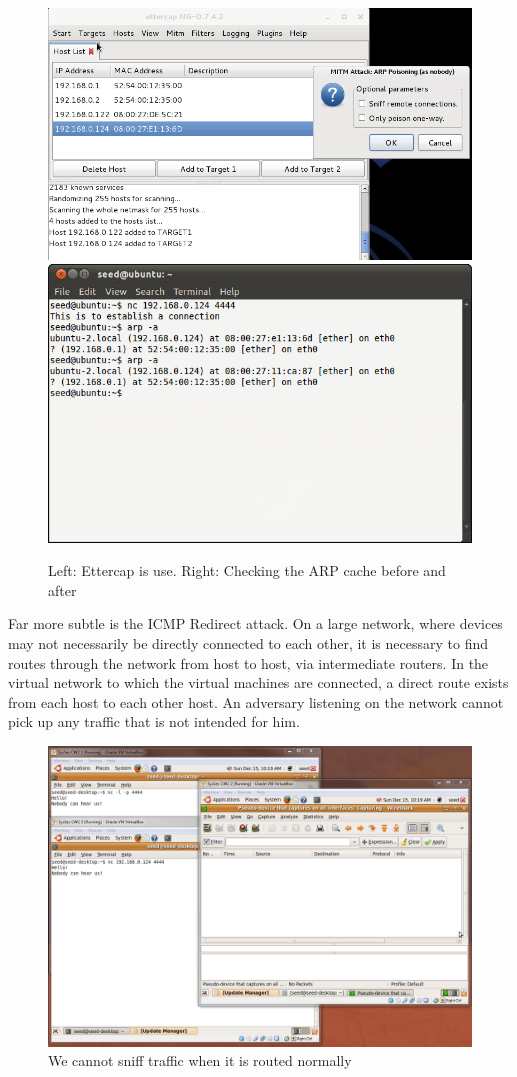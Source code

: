 \begin{figure}[h]
    \centering
    \includegraphics[width=.5\linewidth]{images/ettercap.png} \includegraphics[width=.45\linewidth]{images/arp.png}
    \caption{Left: Ettercap is use. Right: Checking the ARP cache before and after} \label{fig:etterarp}
\end{figure}

Far more subtle is the ICMP Redirect attack. On a large network, where devices may not necessarily be directly connected
to each other, it is necessary to find routes through the network from host to host, via intermediate routers. In the
virtual network to which the virtual machines are connected, a direct route exists from each host to each other host. An
adversary listening on the network cannot pick up any traffic that is not intended for him.

\begin{figure}[h]
    \centering
    \includegraphics[width=.7\linewidth]{images/icmp_redirect_before.png}
    \caption{We cannot sniff traffic when it is routed normally} \label{fig:icmp_before}
\end{figure}

